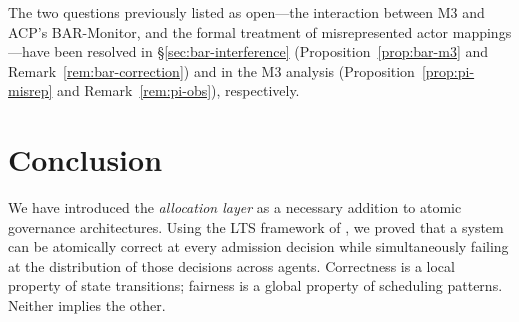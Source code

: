 \documentclass[11pt]{article}
\theoremstyle{plain}
\theoremstyle{definition}
\theoremstyle{remark}
\begin{document}
The two questions previously listed as open---the interaction between
M3 and ACP's BAR-Monitor, and the formal treatment of misrepresented
actor mappings---have been resolved in
\S\ref{sec:bar-interference} (Proposition~\ref{prop:bar-m3} and
Remark~\ref{rem:bar-correction}) and in the M3 analysis
(Proposition~\ref{prop:pi-misrep} and Remark~\ref{rem:pi-obs}),
respectively.

\section{Conclusion}
\label{sec:conclusion}

%
%
%
%
%
%

We have introduced the \emph{allocation layer} as a necessary addition
to atomic governance architectures.  Using the LTS framework of
\citet{fernandez2026a}, we proved that a system can be atomically
correct at every admission decision while simultaneously failing at the
distribution of those decisions across agents.  Correctness is a local
property of state transitions; fairness is a global property of
scheduling patterns.  Neither implies the other.
\end{document}
